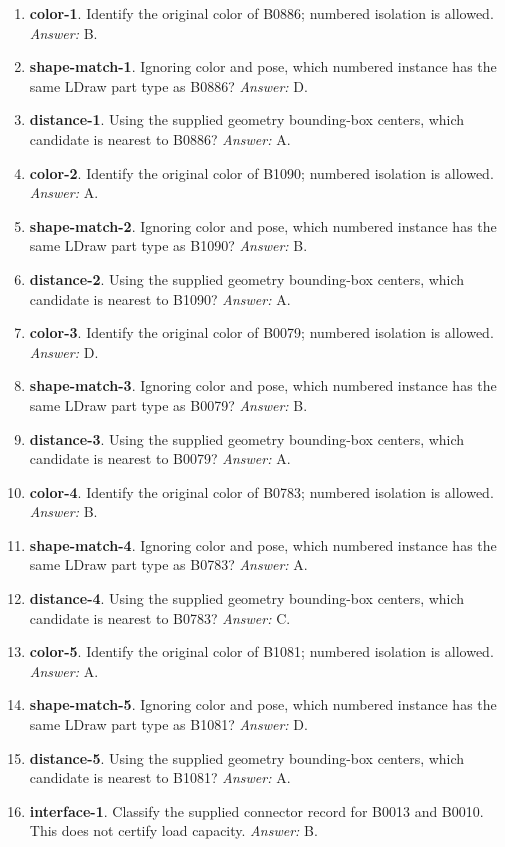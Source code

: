\begin{enumerate}
\item \textbf{color-1}. Identify the original color of B0886; numbered isolation is allowed. \textit{Answer:} B.
\item \textbf{shape-match-1}. Ignoring color and pose, which numbered instance has the same LDraw part type as B0886? \textit{Answer:} D.
\item \textbf{distance-1}. Using the supplied geometry bounding-box centers, which candidate is nearest to B0886? \textit{Answer:} A.
\item \textbf{color-2}. Identify the original color of B1090; numbered isolation is allowed. \textit{Answer:} A.
\item \textbf{shape-match-2}. Ignoring color and pose, which numbered instance has the same LDraw part type as B1090? \textit{Answer:} B.
\item \textbf{distance-2}. Using the supplied geometry bounding-box centers, which candidate is nearest to B1090? \textit{Answer:} A.
\item \textbf{color-3}. Identify the original color of B0079; numbered isolation is allowed. \textit{Answer:} D.
\item \textbf{shape-match-3}. Ignoring color and pose, which numbered instance has the same LDraw part type as B0079? \textit{Answer:} B.
\item \textbf{distance-3}. Using the supplied geometry bounding-box centers, which candidate is nearest to B0079? \textit{Answer:} A.
\item \textbf{color-4}. Identify the original color of B0783; numbered isolation is allowed. \textit{Answer:} B.
\item \textbf{shape-match-4}. Ignoring color and pose, which numbered instance has the same LDraw part type as B0783? \textit{Answer:} A.
\item \textbf{distance-4}. Using the supplied geometry bounding-box centers, which candidate is nearest to B0783? \textit{Answer:} C.
\item \textbf{color-5}. Identify the original color of B1081; numbered isolation is allowed. \textit{Answer:} A.
\item \textbf{shape-match-5}. Ignoring color and pose, which numbered instance has the same LDraw part type as B1081? \textit{Answer:} D.
\item \textbf{distance-5}. Using the supplied geometry bounding-box centers, which candidate is nearest to B1081? \textit{Answer:} A.
\item \textbf{interface-1}. Classify the supplied connector record for B0013 and B0010. This does not certify load capacity. \textit{Answer:} B.

\end{enumerate}

